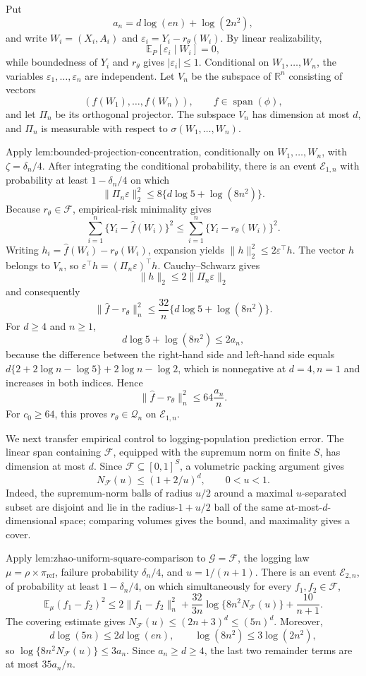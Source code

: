 Put
\[
a_n=d\log(en)+\log(2n^2),
\]
and write \(W_i=(X_i,A_i)\) and \(\varepsilon_i=Y_i-r_\theta(W_i)\). By linear realizability,
\[
\mathbb E_P[\varepsilon_i\mid W_i]=0,
\]
while boundedness of \(Y_i\) and \(r_\theta\) gives \(|\varepsilon_i|\le1\). Conditional on \(W_1,\ldots,W_n\), the variables \(\varepsilon_1,\ldots,\varepsilon_n\) are independent. Let \(V_n\) be the subspace of \(\mathbb R^n\) consisting of vectors
\[
(f(W_1),\ldots,f(W_n)),\qquad f\in\operatorname{span}(\phi),
\]
and let \(\Pi_n\) be its orthogonal projector. The subspace \(V_n\) has dimension at most \(d\), and \(\Pi_n\) is measurable with respect to \(\sigma(W_1,\ldots,W_n)\).

Apply \(\text{lem:bounded-projection-concentration}\), conditionally on \(W_1,\ldots,W_n\), with \(\zeta=\delta_n/4\). After integrating the conditional probability, there is an event \(\mathcal E_{1,n}\) with probability at least \(1-\delta_n/4\) on which
\[
\|\Pi_n\varepsilon\|_2^2\le8\{d\log5+\log(8n^2)\}.
\]
Because \(r_\theta\in\mathcal F\), empirical-risk minimality gives
\[
\sum_{i=1}^n\{Y_i-\widehat f(W_i)\}^2\le\sum_{i=1}^n\{Y_i-r_\theta(W_i)\}^2.
\]
Writing \(h_i=\widehat f(W_i)-r_\theta(W_i)\), expansion yields \(\|h\|_2^2\le2\varepsilon^\top h\). The vector \(h\) belongs to \(V_n\), so \(\varepsilon^\top h=(\Pi_n\varepsilon)^\top h\). Cauchy--Schwarz gives
\[
\|h\|_2\le2\|\Pi_n\varepsilon\|_2
\]
and consequently
\[
\|\widehat f-r_\theta\|_n^2\le\frac{32}{n}\{d\log5+\log(8n^2)\}.
\]
For \(d\ge4\) and \(n\ge1\),
\[
d\log5+\log(8n^2)\le2a_n,
\]
because the difference between the right-hand side and left-hand side equals \(d\{2+2\log n-\log5\}+2\log n-\log2\), which is nonnegative at \(d=4,n=1\) and increases in both indices. Hence
\[
\|\widehat f-r_\theta\|_n^2\le64\frac{a_n}{n}.
\]
For \(c_0\ge64\), this proves \(r_\theta\in\mathcal Q_n\) on \(\mathcal E_{1,n}\).

We next transfer empirical control to logging-population prediction error. The linear span containing \(\mathcal F\), equipped with the supremum norm on finite \(S\), has dimension at most \(d\). Since \(\mathcal F\subseteq[0,1]^S\), a volumetric packing argument gives
\[
N_{\mathcal F}(u)\le(1+2/u)^d,
\qquad0<u<1.
\]
Indeed, the supremum-norm balls of radius \(u/2\) around a maximal \(u\)-separated subset are disjoint and lie in the radius-\(1+u/2\) ball of the same at-most-\(d\)-dimensional space; comparing volumes gives the bound, and maximality gives a cover.

Apply \(\text{lem:zhao-uniform-square-comparison}\) to \(\mathcal G=\mathcal F\), the logging law \(\mu=\rho\times\pi_{\mathrm{ref}}\), failure probability \(\delta_n/4\), and \(u=1/(n+1)\). There is an event \(\mathcal E_{2,n}\), of probability at least \(1-\delta_n/4\), on which simultaneously for every \(f_1,f_2\in\mathcal F\),
\[
\mathbb E_\mu(f_1-f_2)^2
\le2\|f_1-f_2\|_n^2+\frac{32}{3n}\log\{8n^2N_{\mathcal F}(u)\}+\frac{10}{n+1}.
\]
The covering estimate gives \(N_{\mathcal F}(u)\le(2n+3)^d\le(5n)^d\). Moreover,
\[
d\log(5n)\le2d\log(en),
\qquad
\log(8n^2)\le3\log(2n^2),
\]
so \(\log\{8n^2N_{\mathcal F}(u)\}\le3a_n\). Since \(a_n\ge d\ge4\), the last two remainder terms are at most \(35a_n/n\).

